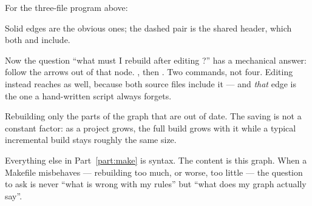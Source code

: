 For the three-file program above:

\begin{center}
\end{center}

Solid edges are the obvious ones; the dashed pair is the shared header, which
both  and  include.

Now the question ``what must I rebuild after editing ?'' has a
mechanical answer: follow the arrows out of that node. , then
. Two commands, not four. Editing  instead reaches
 as well, because both source files include it --- and \emph{that}
edge is the one a hand-written script always forgets.

\begin{definition}
	Rebuilding only the parts of the graph that are out of date. The saving is not
	a constant factor: as a project grows, the full build grows with it while a
	typical incremental build stays roughly the same size.
\end{definition}

\begin{moral}
	Everything else in Part~\ref{part:make} is syntax. The content is this graph.
	When a Makefile misbehaves --- rebuilding too much, or worse, too little ---
	the question to ask is never ``what is wrong with my rules'' but ``what does my
	graph actually say''.
\end{moral}


